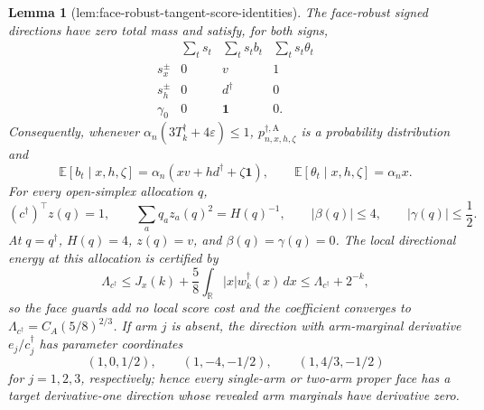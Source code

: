 \documentclass{article}
\newtheorem{lemma}{Lemma}
\begin{document}
{\begin{lemma}[lem:face-robust-tangent-score-identities]\label{lem:face-robust-tangent-score-identities}
The face-robust signed directions have zero total mass and satisfy, for both signs,
\[
\begin{array}{c|ccc}
&\sum_t s_t&\sum_t s_tb_t&\sum_t s_t\theta_t\\ \hline
s_x^\pm&0&v&1\\
s_h^\pm&0&d^\dagger&0\\
\gamma_0&0&\mathbf1&0.
\end{array}
\]
Consequently, whenever
\(\alpha_n(3T_k^\dagger+4\varepsilon)\le1\),
\(p_{n,x,h,\zeta}^{\dagger,\mathrm A}\) is a probability distribution and
\[
\mathbb E[b_t\mid x,h,\zeta]
=\alpha_n(xv+hd^\dagger+\zeta\mathbf1),
\qquad
\mathbb E[\theta_t\mid x,h,\zeta]=\alpha_nx.
\]
For every open-simplex allocation \(q\),
\[
(c^\dagger)^\top z(q)=1,
\qquad
\sum_aq_az_a(q)^2=H(q)^{-1},
\qquad
|\beta(q)|\le4,
\qquad
|\gamma(q)|\le\frac12.
\]
At \(q=q^\dagger\), \(H(q)=4\), \(z(q)=v\), and
\(\beta(q)=\gamma(q)=0\).  The local directional energy at this allocation is certified by
\[
\Lambda_{c^\dagger}\le
J_x(k)+\frac58\int_{\mathbb R}|x|w_k^\dagger(x)\,dx
\le\Lambda_{c^\dagger}+2^{-k},
\]
so the face guards add no local score cost and the coefficient converges to
\(\Lambda_{c^\dagger}=C_A(5/8)^{2/3}\).  If arm \(j\) is absent, the direction with arm-marginal derivative \(e_j/c_j^\dagger\) has parameter coordinates
\[
(1,0,1/2),\qquad (1,-4,-1/2),\qquad
(1,4/3,-1/2)
\]
for \(j=1,2,3\), respectively; hence every single-arm or two-arm proper face has a target derivative-one direction whose revealed arm marginals have derivative zero.


\end{lemma}}
\end{document}

